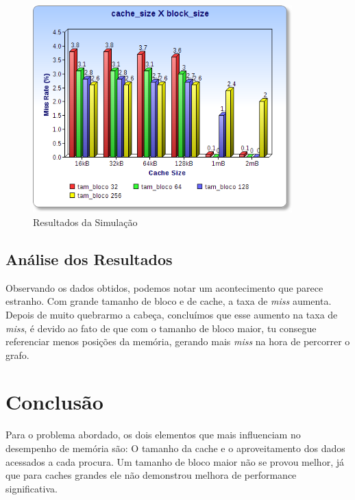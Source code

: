 \documentclass[12pt]{article}
\begin{document}
\begin{figure}[H]
\centering
\includegraphics[width=100mm]{fig.png}
\caption{Resultados da Simulação}
\label{fig1}
\end{figure}

\subsection{Análise dos Resultados}

Observando os dados obtidos, podemos notar um acontecimento que parece estranho.
Com grande tamanho de bloco e de cache, a taxa de \emph{miss} aumenta. Depois
de muito quebrarmo a cabeça, concluímos que esse aumento na taxa de \emph{miss},
é devido ao fato de que com o tamanho de bloco maior, tu consegue referenciar
menos posições da memória, gerando mais \emph{miss} na hora de percorrer o grafo.

\section{Conclusão}

Para o problema abordado, os dois elementos que mais influenciam no desempenho
de memória são: O tamanho da cache e o aproveitamento dos dados acessados a cada
procura. Um tamanho de bloco maior não se provou melhor, já que para caches
grandes ele não demonstrou melhora de performance significativa.
\end{document}

